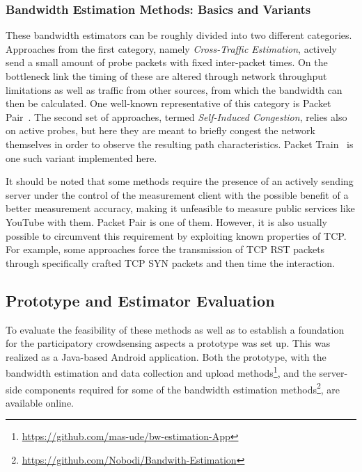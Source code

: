 \subsubsection{Bandwidth Estimation Methods: Basics and Variants}

These bandwidth estimators can be roughly divided into two different categories. Approaches from the first category, namely \textit{Cross-Traffic Estimation}, actively send a small amount of probe packets with fixed inter-packet times. On the bottleneck link the timing of these are altered through network throughput limitations as well as traffic from other sources, from which the bandwidth can then be calculated. One well-known representative of this category is Packet Pair~\cite{Bolot:1993:EPD:167954.166265,749288}. The second set of approaches, termed \textit{Self-Induced Congestion}, relies also on active probes, but here they are meant to briefly congest the network themselves in order to observe the resulting path characteristics. Packet Train~\cite{Jain02pathload:a} is one such variant implemented here.

It should be noted that some methods require the presence of an actively sending server under the control of the measurement client with the possible benefit of a better measurement accuracy, making it unfeasible to measure public services like YouTube with them. Packet Pair is one of them. However, it is also usually possible to circumvent this requirement by exploiting known properties of \acrshort{TCP}. For example, some approaches \cite{saroiu2002sprobe,Chakravarty08linkwidth:a} force the transmission of \gls{TCP} RST packets through specifically crafted \gls{TCP} SYN packets and then time the interaction.


\subsection{Prototype and Estimator Evaluation}

To evaluate the feasibility of these methods as well as to establish a foundation for the participatory crowdsensing aspects a prototype was set up. This was realized as a Java-based Android application. Both the prototype, with the bandwidth estimation and data collection and upload methods\footnote{\url{https://github.com/mas-ude/bw-estimation-App}}, and the  server-side components required for some of the bandwidth estimation methods\footnote{\url{https://github.com/Nobodi/Bandwith-Estimation}}, are available online.

